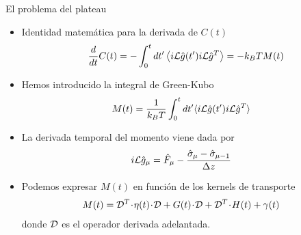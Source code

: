\documentclass{beamer}
\newcommand{\esc}{\!\cdot\!}
\newcommand{\llangle}{\left\langle}
\newcommand{\rrangle}{\right\rangle}
\begin{document}
\begin{frame}{El problema del plateau}
  \begin{itemize}
    \item<1-> Identidad matemática para la derivada de $C(t)$
\begin{align}
  \frac{d}{dt}C(t)
=-  \int_0^t dt' \llangle i{\cal L}\hat{g}(t') i{\cal L}\hat{g}^T\rrangle
=-  k_BT M(t)
\nonumber
\end{align}
\item<2-> Hemos introducido la integral de Green-Kubo 
\begin{align}
M(t)&= \frac{1}{k_BT}\int_0^t dt'\langle i{\cal L}\hat{g}(t')i{\cal L} \hat{g}^T\rangle
\nonumber
\end{align}
\item<3-> La derivada temporal del momento viene dada por
\begin{align}
  i{\cal L}\hat{g}_\mu &=\hat{F}_\mu-\frac{\hat{\sigma}_\mu-\hat{\sigma}_{\mu-1}}{\Delta z}
\nonumber
\end{align}
\item<4-> Podemos expresar $M(t)$ en función de los kernels de transporte 
\begin{align}
  {M}(t)&={\cal D}^T\esc{\eta}(t)\esc {\cal D}+{G}(t)\esc {\cal D}+{\cal D}^T\esc{H}(t)+{\gamma}(t)
\nonumber
\end{align}
donde ${\cal D}$ es el operador derivada adelantada. 
  \end{itemize}
\end{frame}

\end{document}
